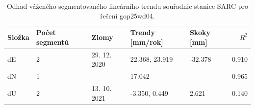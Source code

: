 \begin{table}[htbp]
\caption{Odhad váženého segmentovaného lineárního trendu souřadnic stanice SARC pro řešení gop25wd04.}
\label{tab:gop25wd04_stcd_sarc_weighted_multiseg}
\begin{tabular}{lllllr}
\toprule
Složka & Počet segmentů & Zlomy & Trendy [mm/rok] & Skoky [mm] & $R^2$ \\
\midrule
dE & 2 & 29. 12. 2020 & 22.368, 23.919 & -32.378 & 0.910 \\
dN & 1 &  & 17.042 &  & 0.965 \\
dU & 2 & 13. 10. 2021 & -3.350, 0.449 & 2.621 & 0.140 \\
\bottomrule
\end{tabular}
\end{table}
